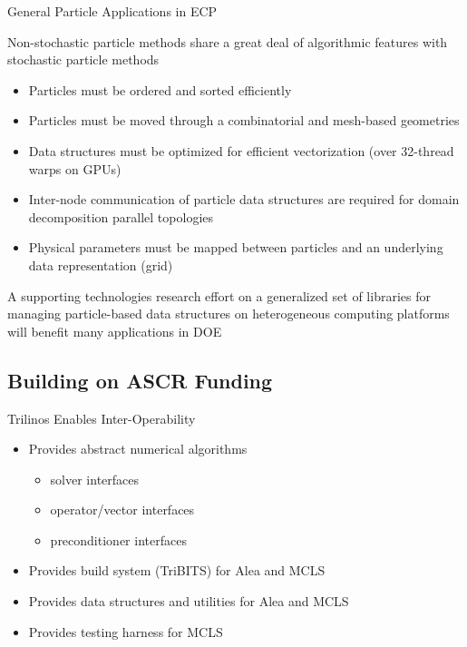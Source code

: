 \documentclass{beamer}
\begin{document}
\begin{frame}{General Particle Applications in ECP}

  Non-stochastic particle methods share a great deal of algorithmic features
  with stochastic particle methods
  \begin{itemize}
  \item Particles must be ordered and sorted efficiently
  \item Particles must be moved through a combinatorial and mesh-based
    geometries
  \item Data structures must be optimized for efficient vectorization (over
    32-thread warps on GPUs)
  \item Inter-node communication of particle data structures are required for
    domain decomposition parallel topologies
  \item Physical parameters must be mapped between particles and an underlying
    data representation (grid)
  \end{itemize}

  \vfill

  A supporting technologies research effort on a generalized set of libraries
  for managing particle-based data structures on heterogeneous computing
  platforms will benefit many applications in DOE

\end{frame}

\subsection{Building on ASCR Funding}

\begin{frame}{Trilinos Enables Inter-Operability}

  \begin{itemize}
  \item Provides abstract numerical algorithms
    \begin{itemize}
    \item solver interfaces
    \item operator/vector interfaces
    \item preconditioner interfaces
    \end{itemize}
    \vfill
  \item Provides build system (TriBITS) for Alea and MCLS
    \vfill
  \item Provides data structures and utilities for Alea and MCLS
    \vfill
  \item Provides testing harness for MCLS
  \end{itemize}

\end{frame}
\end{document}

